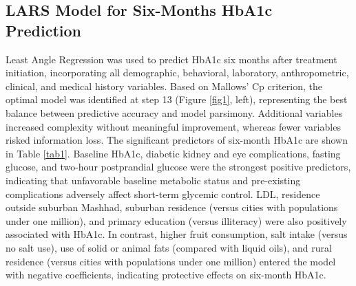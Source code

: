 \documentclass[twoside]{article}
\begin{document}
\subsection{LARS Model for Six-Months HbA1c Prediction}
Least Angle Regression was used to predict HbA1c six months after treatment initiation, incorporating all demographic, behavioral, laboratory, anthropometric, clinical, and medical history variables. Based on Mallows’ Cp criterion, the optimal model was identified at step 13 (Figure \ref{fig1}, left), representing the best balance between predictive accuracy and model parsimony. Additional variables increased complexity without meaningful improvement, whereas fewer variables risked information loss.
The significant predictors of six-month HbA1c are shown in Table \ref{tab1}. Baseline HbA1c, diabetic kidney and eye complications, fasting glucose, and two-hour postprandial glucose were the strongest positive predictors, indicating that unfavorable baseline metabolic status and pre-existing complications adversely affect short-term glycemic control. LDL, residence outside suburban Mashhad, suburban residence (versus cities with populations under one million), and primary education (versus illiteracy) were also positively associated with HbA1c. In contrast, higher fruit consumption, salt intake (versus no salt use), use of solid or animal fats (compared with liquid oils), and rural residence (versus cities with populations under one million) entered the model with negative coefficients, indicating protective effects on six-month HbA1c.
\end{document}

